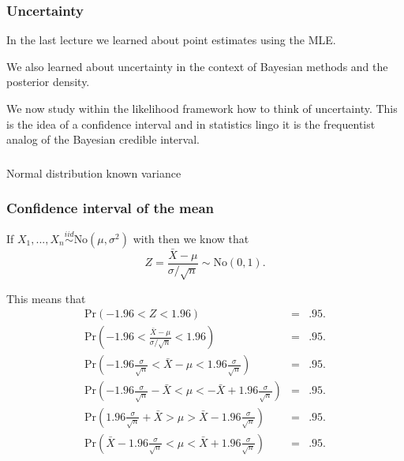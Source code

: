 \begin{frame}[fragile]\frametitle{Uncertainty}

In the last lecture we learned about point estimates using
the MLE. \\ 

\vspace{.1in}

We also learned about uncertainty in the context of Bayesian
methods and the posterior density. \\ 

\vspace{.1in}

We now study within the likelihood framework how to think
of uncertainty. This is the idea of a confidence interval
and in statistics lingo it is the frequentist analog of the
Bayesian credible interval.

\end{frame}


\begin{frame}[fragile]\frametitle{}
\begin{center}
{\Large Normal distribution known variance}

\end{center}
\end{frame}




\begin{frame}[fragile]\frametitle{Confidence interval of the mean }

{\tiny
If $X_1,...,X_n \stackrel{iid}{\sim} \mbox{No}(\mu,\sigma^2)$
with then we know that 
$$Z = \frac{\bar{X}-\mu}{\sigma / \sqrt{n}} \sim\mbox{No}(0,1).$$ 

This means that
\begin{eqnarray*}
\mbox{Pr}\left(-1.96 < Z < 1.96\right) &= &.95.\\
\mbox{Pr}\left(-1.96 < \frac{\bar{X}-\mu}{\sigma / \sqrt{n}}  <
  1.96\right) &= &.95.\\ 
\mbox{Pr}\left(-1.96 \frac{\sigma}{\sqrt{n}} < \bar{X}-\mu  <
  1.96 \frac{\sigma}{\sqrt{n}} \right) &= &.95.\\ 
\mbox{Pr}\left(-1.96 \frac{\sigma}{\sqrt{n}} - \bar{X}< \mu  <
  -\bar{X} + 1.96 \frac{\sigma}{\sqrt{n}} \right) &= &.95.\\ 
\mbox{Pr}\left(1.96 \frac{\sigma}{\sqrt{n}} + \bar{X} > \mu  >
  \bar{X} - 1.96 \frac{\sigma}{\sqrt{n}} \right) &= &.95.\\ 
\mbox{Pr}\left( \bar{X} - 1.96 \frac{\sigma}{\sqrt{n}}  < \mu  <
  \bar{X} + 1.96 \frac{\sigma}{\sqrt{n}} \right) &= &.95.
\end{eqnarray*}
}
\end{frame}

